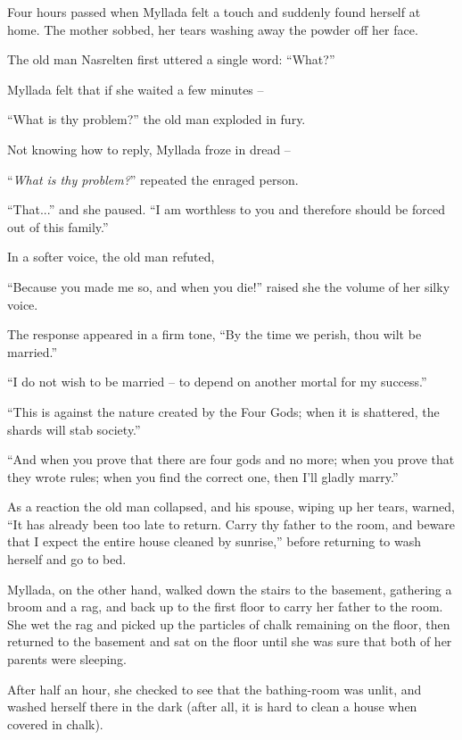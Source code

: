 Four hours passed when Myllada felt a touch and suddenly found herself at home. The mother sobbed, her tears washing away the powder off her face.

The old man Nasrelten first uttered a single word: ``What?''

Myllada felt that if she waited a few minutes --

``What is thy problem?'' the old man exploded in fury.

Not knowing how to reply, Myllada froze in dread --

``\emph{What is thy problem?}'' repeated the enraged person.

``That...'' and she paused. ``I am worthless to you and therefore should be forced out of this family.''

In a softer voice, the old man refuted,


``Because you made me so, and when you die!'' raised she the volume of her silky voice.

The response appeared in a firm tone, ``By the time we perish, thou wilt be married.''

``I do not wish to be married -- to depend on another mortal for my success.''

``This is against the nature created by the Four Gods; when it is shattered, the shards will stab society.''

``And when you prove that there are four gods and no more; when you prove that they wrote rules; when you find the correct one, then I'll gladly marry.''

As a reaction the old man collapsed, and his spouse, wiping up her tears, warned, ``It has already been too late to return. Carry thy father to the room, and beware that I expect the entire house cleaned by sunrise,'' before returning to wash herself and go to bed.

Myllada, on the other hand, walked down the stairs to the basement, gathering a broom and a rag, and back up to the first floor to carry her father to the room. She wet the rag and picked up the particles of chalk remaining on the floor, then returned to the basement and sat on the floor until she was sure that both of her parents were sleeping.

After half an hour, she checked to see that the bathing-room was unlit, and washed herself there in the dark (after all, it is hard to clean a house when covered in chalk).

